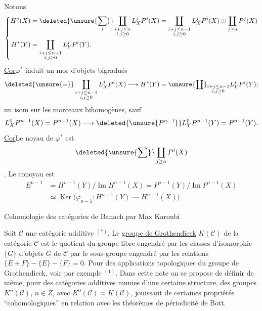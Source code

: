 \uline{}\qquad Notons
\[
\left\{\begin{aligned}
H^*(X)&=\deleted{\unsure{\sum_i}}\coprod_{\substack{i+j\leq n\\i,j\geq0}}L_X^jP^i(X)
=\coprod_{\substack{i+j\leq n-1\\i,j\geq0}}L_X^jP^i(X)\oplus\coprod_{j\geq n}P^j(X)\\
H^*(Y)&=\coprod_{\substack{i+j\leq n-1\\i,j\geq0}}L_Y^jP^i(Y).
\end{aligned}\right.
\]
\uline{Cor}\qquad $\varphi^*$ induit un mor d'objets bigradués
\[
\deleted{\unsure{=}}\coprod_{\substack{i+j\leq n-1\\i,j\geq0}}L_X^jP^i(X)
\longrightarrow H^*(Y)=\unsure{\coprod}_{\substack{i+j\leq n-1\\i,j\geq0}}L_Y^jP^i(Y);\]
  un isom sur les morceaux bihomogènes, sauf
\[
L_X^0P^{n-1}(X)=P^{n-1}(X)\longrightarrow\deleted{\unsure{P^{n-1}}}L_Y^0P^{n-1}(Y)=P^{n-1}(Y).
\]
\uline{Cor}\qquad Le noyau de $\varphi^*$ est 
\[\deleted{\unsure{\sum}}\coprod_{j\geq n}P^i(X)\]
. Le conoyau est
\[
\begin{aligned}
E^{n-1}&=H^{n-1}(Y)/\operatorname{Im}H^{n-1}(X)=P^{n-1}(Y)/\operatorname{Im}P^{n-1}(X)\\
&\simeq\operatorname{Ker}\bigl(\varphi_{n-1}:H^{n-1}(Y)\mathrel{\text{---}}H^{n+1}(X)\bigr)
\end{aligned}
\]

\begin{center}
Cohomologie des catégories de Banach
par Max Karoubi
\end{center}

Soit $\mathcal C$ une catégorie additive $^{(*)}$. Le \uline{groupe de Grothendieck} $K(\mathcal C)$ de la catégorie $\mathcal C$ est le quotient du groupe libre engendré par les classes d'isomorphie $\{G\}$ d'objets $G$ de $\mathcal C$ par le sous-groupe engendré par les relations $\{E+F\}-\{E\}-\{F\}=0$. Pour des applications topologiques du groupe de Grothendieck, voir par exemple $^{(1)}$. Dans cette note on se propose de définir de même, pour des catégories additives munies d'une certaine structure, des groupes $K^n(\mathcal C)$, $n\in Z$, avec $K^0(\mathcal C)\approx K(\mathcal C)$, jouissant de certaines propriétés ``cohomologiques'' en relation avec les théorèmes de périodicité de Bott.

